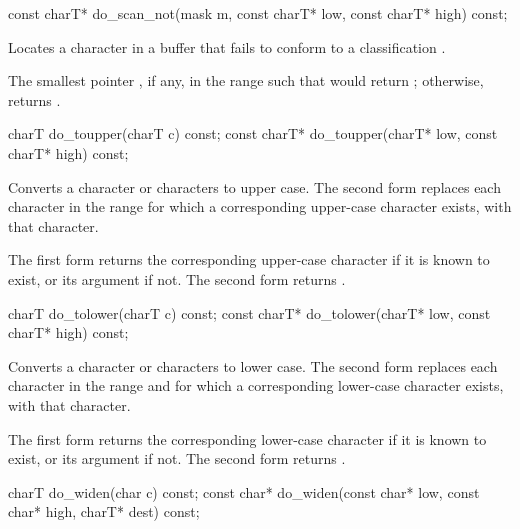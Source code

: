 %
\begin{itemdecl}
const charT* do_scan_not(mask m, const charT* low, const charT* high) const;
\end{itemdecl}

\begin{itemdescr}
\pnum
\effects
Locates a character in a buffer that fails to conform to a classification
.

\pnum
\returns
The smallest pointer , if any, in the range 
such that  would return ;
otherwise, returns .
\end{itemdescr}

%
\begin{itemdecl}
charT        do_toupper(charT c) const;
const charT* do_toupper(charT* low, const charT* high) const;
\end{itemdecl}

\begin{itemdescr}
\pnum
\effects
Converts a character or characters to upper case.
The second form replaces
each character  in the range 
for which a corresponding upper-case character exists,
with that character.

\pnum
\returns
The first form returns
the corresponding upper-case character if it is known to exist, or
its argument if not.
The second form returns .
\end{itemdescr}

%
\begin{itemdecl}
charT        do_tolower(charT c) const;
const charT* do_tolower(charT* low, const charT* high) const;
\end{itemdecl}

\begin{itemdescr}
\pnum
\effects
Converts a character or characters to lower case.
The second form replaces
each character  in the range 
and for which a corresponding lower-case character exists,
with that character.

\pnum
\returns
The first form returns
the corresponding lower-case character if it is known to exist, or
its argument if not.
The second form returns .
\end{itemdescr}

%
\begin{itemdecl}
charT        do_widen(char c) const;
const char*  do_widen(const char* low, const char* high, charT* dest) const;
\end{itemdecl}

